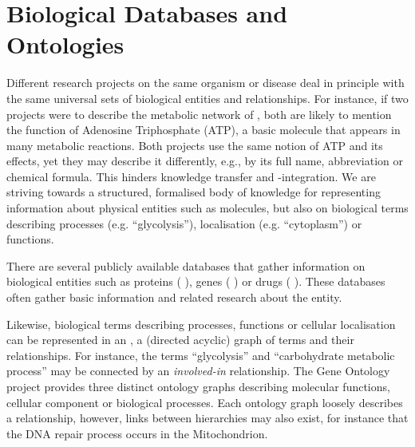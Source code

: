 \documentclass[
	fontsize=10pt, %
	twoside=true, %
	secnumdepth=1, %
  toc=indentunnumbered %
]{kaobook}
\begin{document}
\section{Biological Databases and Ontologies}
\label{sec:ontologies}



Different research projects on the same organism or disease deal in principle
with the same universal sets of biological entities and relationships. For
instance, if two projects were to describe the metabolic network of \ecoli, both
are likely to mention the function of Adenosine Triphosphate (ATP), a basic
molecule that appears in many metabolic reactions. Both projects use the same
notion of ATP and its effects, yet they may describe it differently, e.g., by
its full name, abbreviation or
chemical formula. This hinders knowledge transfer and -integration. We are
striving towards a structured, formalised body of knowledge for representing
information about physical entities such as molecules, but also on biological terms
describing processes (e.g. ``glycolysis''), localisation (e.g. ``cytoplasm'') or
functions.

There are several publicly available databases that gather information on
biological entities such as proteins (
\cite{theuniprotconsortium_UniProtUniversalProtein_2021}), genes
( \cite{maglott_EntrezGeneGenecentered_2005}) or drugs
( \cite{wishart_DrugBankKnowledgebaseDrugs_2008}). These
databases often gather basic information and related research about the entity.

Likewise, biological terms describing processes, functions or cellular
localisation can be represented in an , a (directed acyclic) graph
of terms and their relationships. For instance, the terms ``glycolysis'' and
``carbohydrate metabolic process'' may be connected by an \textit{involved-in}
relationship. The Gene Ontology project \cite{ashburner_GeneOntologyTool_2000}
provides three distinct ontology graphs describing molecular functions, cellular
component or biological processes. Each ontology graph loosely describes a
relationship, however, links between hierarchies may also exist, for instance
that the DNA repair process occurs in the Mitochondrion.
\end{document}
